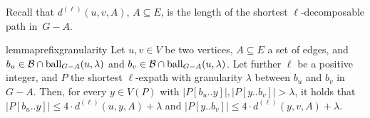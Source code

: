 \documentclass{theoretics}
\newcommand*{\B}{\mathcal{B}}
\newcommand*{\length}[1]{|#1|}
\newcommand*{\ball}{\mbox{\rm ball}}
\renewcommand{\le}{\leqslant}
\begin{document}
Recall that $d^{(\ell)}(u,v,A)$, $A \subseteq E$, is the length
of the shortest $\ell$-decomposable path in~$G{-}A$.

\begin{restatable}{lemma}{prefixgranularity}
\label{lemma:expath_with_granularity_lambda}
  Let $u,v \in V$ be two vertices, $A \subseteq E$ a set of edges,
  and $b_u \in \B \cap \ball_{G-A}(u,\lambda)$ and $b_v \in \B \cap \ball_{G-A}(u,\lambda)$.
  Let further $\ell$ be a positive integer, 
  and $P$ the shortest $\ell$-expath with granularity $\lambda$ between $b_u$ and $b_v$ in $G-A$.
  Then, for every $y \in V(P)$ with $|P[b_u..y]|,|P[y..b_v]| > \lambda$, it holds that
  $\length{P[b_u..y]} \le 4 \cdot d^{(\ell)}(u,y,A) + \lambda$ 
  and $\length{P[y..b_v]} \le 4 \cdot d^{(\ell)}(y,v,A) + \lambda$.
\end{restatable}
\end{document}
